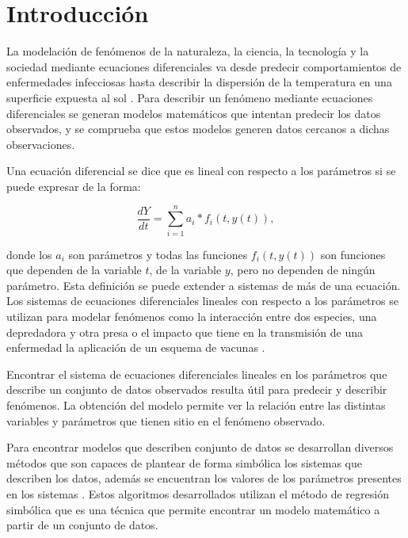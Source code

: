 \chapter*{Introducción}\label{chapter:introduction}

\qquad

La modelación de fenómenos de la naturaleza, la ciencia, la tecnología y la sociedad mediante ecuaciones diferenciales va desde predecir comportamientos de enfermedades infecciosas \cite{weiss2013sir} hasta describir la dispersión de la temperatura en una superficie expuesta al sol \cite{p-transferencia-calor}. Para describir un fenómeno mediante ecuaciones diferenciales se generan modelos matemáticos que intentan predecir los datos observados, y se comprueba que estos modelos generen datos cercanos a dichas observaciones.

Una ecuación diferencial se dice que es lineal con respecto a los parámetros si se puede expresar de la forma:

$$\frac{dY}{dt} = \sum_{i=1}^{n} a_i * f_i(t, y(t)),$$

donde los $a_i$ son parámetros y todas las funciones $f_i(t,y(t))$ son funciones que dependen de la variable $t$, de la variable $y$, pero no dependen de ningún parámetro. Esta definición se puede extender a sistemas de más de una ecuación. Los sistemas de ecuaciones diferenciales lineales con respecto a los parámetros se utilizan para modelar fenómenos como la interacción entre dos especies, una depredadora y otra presa \cite{Hoppensteadt:2006} o el impacto que tiene en la transmisión de una enfermedad la aplicación de un esquema de vacunas \cite{kuddus2021mathematical}.

Encontrar el sistema de ecuaciones diferenciales lineales en los parámetros que describe un conjunto de datos observados resulta útil para predecir y describir fenómenos. La obtención del modelo permite ver la relación entre las distintas variables y parámetros que tienen sitio en el fenómeno observado.

Para encontrar modelos que describen conjunto de datos se desarrollan diversos métodos que son capaces de plantear de forma simbólica los sistemas que describen los datos, además se encuentran los valores de los parámetros presentes en los sistemas \cite{gplearn, schmidt2013eureqa}. Estos algoritmos desarrollados utilizan el método de regresión simbólica que es una técnica que permite encontrar un modelo matemático a partir de un conjunto de datos.

